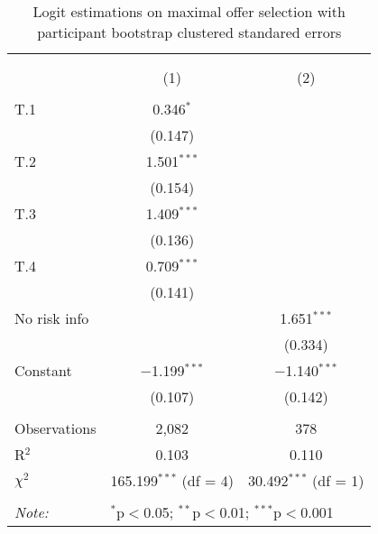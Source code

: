 
\begin{table}[H] \centering 
  \caption{Logit estimations on maximal offer selection with participant bootstrap clustered standared errors } 
  \label{tbl:glm_treat_effects} 
\begin{tabular}{@{\extracolsep{5pt}}lcc} 
\\[-1.8ex]\hline 
\hline \\[-1.8ex] 
\\[-1.8ex] & (1) & (2)\\ 
\hline \\[-1.8ex] 
 T.1 & 0.346$^{*}$ &  \\ 
  & (0.147) &  \\ 
  T.2 & 1.501$^{***}$ &  \\ 
  & (0.154) &  \\ 
  T.3 & 1.409$^{***}$ &  \\ 
  & (0.136) &  \\ 
  T.4 & 0.709$^{***}$ &  \\ 
  & (0.141) &  \\ 
  No risk info &  & 1.651$^{***}$ \\ 
  &  & (0.334) \\ 
  Constant & $-$1.199$^{***}$ & $-$1.140$^{***}$ \\ 
  & (0.107) & (0.142) \\ 
 \hline \\[-1.8ex] 
Observations & 2,082 & 378 \\ 
R$^{2}$ & 0.103 & 0.110 \\ 
$\chi^{2}$ & 165.199$^{***}$ (df = 4) & 30.492$^{***}$ (df = 1) \\ 
\hline 
\hline \\[-1.8ex] 
\textit{Note:}  & \multicolumn{2}{l}{$^{*}$p$<$0.05; $^{**}$p$<$0.01; $^{***}$p$<$0.001} \\ 
\end{tabular} 
\end{table} 
